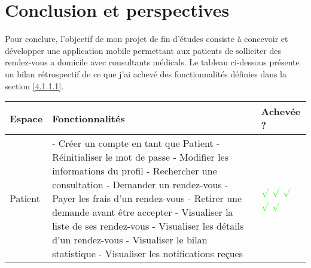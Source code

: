 \chapter{Conclusion et perspectives}
\label{chap:conclusion}

Pour conclure, l’objectif de mon projet de fin d’études consiste à concevoir et développer une application mobile permettant aux patients de solliciter des rendez-vous a domicile avec consultants médicals. Le tableau ci-dessous présente un bilan rétrospectif de ce que j'ai achevé des fonctionnalités définies dans la section \ref{4.1.1.1}.
\begin{table}[h]
	\begin{tabular}{|m{4cm}|m{10cm}|m{2cm}|}
		\hline
		\textbf{Espace} & \textbf{Fonctionnalités} & Achevée ? \\
		\hline
		Patient & -	Créer un compte en tant que Patient \newline
		- Réinitialiser le mot de passe \newline
		- Modifier les informations du profil \newline
		- Rechercher une consultation \newline
		- Demander un rendez-vous \newline
		- Payer les frais d’un rendez-vous \newline
		- Retirer une demande avant être accepter \newline
		- Visualiser la liste de ses rendez-vous \newline
		- Visualiser les détails d’un rendez-vous \newline
		- Visualiser le bilan statistique \newline
		- Visualiser les notifications reçues & 
		\begin{math} \color{green} \surd \end{math} \newline
		\begin{math} \color{green} \surd \end{math} \newline
		\begin{math} \color{green} \surd \end{math} \newline
		\begin{math} \color{green} \surd \end{math} \newline
		\begin{math} \color{green} \surd \end{math} \newline

\end{tabular}
\end{table}
